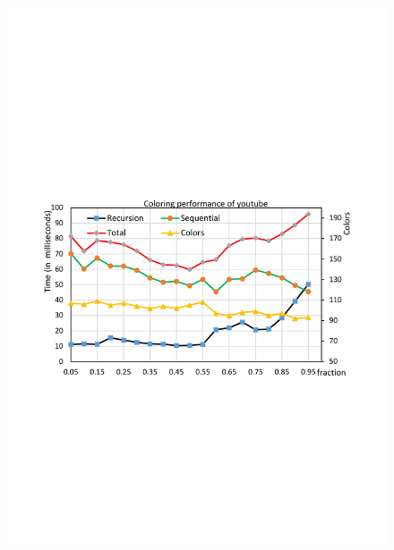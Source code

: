 \begin{figure}[t]
{		\includegraphics[scale=0.2]{figure/exp/youtube.pdf}
	}
	\subfloat[RoadNet]{
		\label{fig:roadnet}
}
\end{figure}
